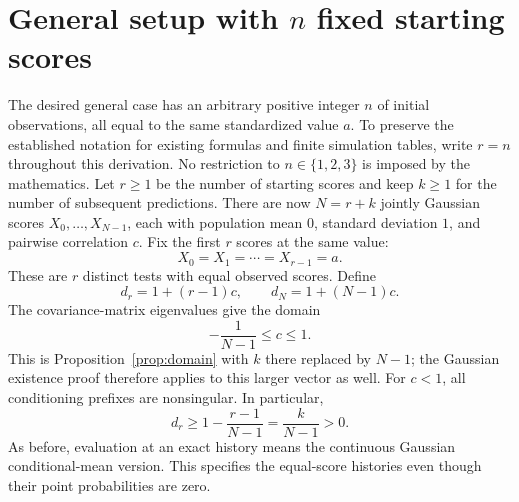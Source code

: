 \section{General setup with \(n\) fixed starting scores}
The desired general case has an arbitrary positive integer \(n\) of
initial observations, all equal to the same standardized value \(a\).
To preserve the established notation for existing formulas and finite
simulation tables, write \(r=n\) throughout this derivation. No restriction
to \(n\in\{1,2,3\}\) is imposed by the mathematics.
Let \(r\geq1\) be the number of starting scores and keep \(k\geq1\) for
the number of subsequent predictions. There are now \(N=r+k\) jointly
Gaussian scores \(X_0,\ldots,X_{N-1}\), each with population mean \(0\),
standard deviation \(1\), and pairwise correlation \(c\). Fix the first
\(r\) scores at the same value:
\begin{equation}
  X_0=X_1=\cdots=X_{r-1}=a.
  \label{eq:multiple-history}
\end{equation}
These are \(r\) distinct tests with equal observed scores. Define
\[
  d_r=1+(r-1)c,\qquad d_N=1+(N-1)c.
\]
The covariance-matrix eigenvalues give the domain
\begin{equation}
  -\frac1{N-1}\leq c\leq1.
  \label{eq:multiple-domain}
\end{equation}
This is Proposition~\ref{prop:domain} with \(k\) there replaced by \(N-1\);
the Gaussian existence proof therefore applies to this larger vector as well.
For \(c<1\), all conditioning prefixes are nonsingular. In particular,
\[
  d_r\geq1-\frac{r-1}{N-1}=\frac{k}{N-1}>0.
\]
As before, evaluation at an exact history means the continuous Gaussian
conditional-mean version. This specifies the equal-score histories even
though their point probabilities are zero.

